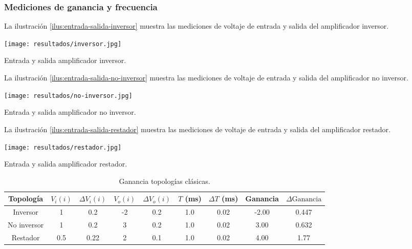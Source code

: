 \FloatBarrier
\subsubsection{Mediciones de ganancia y frecuencia}

La ilustración \ref{ilus:entrada-salida-inversor} muestra las mediciones de voltaje de entrada y salida del amplificador inversor.

\begin{ilustracion}[hb]
    \centering
    \texttt{[image: resultados/inversor.jpg]}
    \caption{Entrada y salida amplificador inversor.}
    \label{ilus:entrada-salida-inversor}
\end{ilustracion}

La ilustración \ref{ilus:entrada-salida-no-inversor} muestra las mediciones de voltaje de entrada y salida del amplificador no inversor.

\begin{ilustracion}[ht]
    \centering
    \texttt{[image: resultados/no-inversor.jpg]}
    \caption{Entrada y salida amplificador no inversor.}
    \label{ilus:entrada-salida-no-inversor}
\end{ilustracion}

La ilustración \ref{ilus:entrada-salida-restador} muestra las mediciones de voltaje de entrada y salida del amplificador restador.

\begin{ilustracion}[ht]
    \centering
    \texttt{[image: resultados/restador.jpg]}
    \caption{Entrada y salida amplificador restador.}
    \label{ilus:entrada-salida-restador}
\end{ilustracion}



\begin{table}[ht]
\centering
\begin{tabular}{|c|c|c|c|c|c|c|c|c|}
\hline
Topología & \(V_i(i)\) & \(\Delta V_i(i)\) & \(V_o(i)\) & \(\Delta V_o(i)\) & \(T\) (ms) & \(\Delta T\) (ms) & Ganancia & \(\Delta \text{Ganancia}\) \\ \hline
Inversor & 1         & 0.2               & -2         & 0.2               & 1.0        & 0.02              & -2.00             & 0.447 \\ \hline
No inversor & 1         & 0.2               & 3          & 0.2               & 1.0        & 0.02              & 3.00              & 0.632 \\ \hline
Restador & 0.5       & 0.22              & 2          & 0.1               & 1.0        & 0.02              & 4.00              & 1.77 \\ \hline
\end{tabular}
\caption{Ganancia topologías clásicas.}
\label{tab:resultados-ganancia-frecuencia-topologias-basicas}
\end{table}

